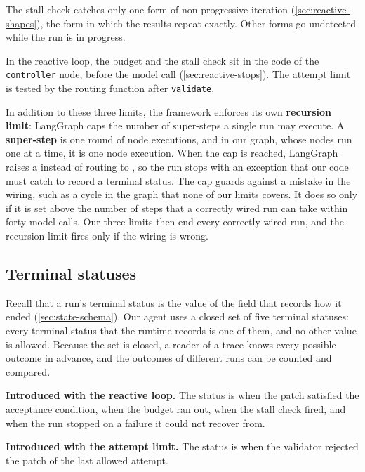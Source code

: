 The stall check catches only one form of non-progressive iteration (\cref{sec:reactive-shapes}),
the form in which the results repeat exactly. Other forms go undetected while the run is in
progress.

In the reactive loop, the budget and the stall check sit in the code of the \texttt{controller}
node, before the model call (\cref{sec:reactive-stops}). The attempt limit is tested by the routing
function after \texttt{validate}.

In addition to these three limits, the framework enforces its own \textbf{recursion limit}:
LangGraph caps the number of super-steps a single run may execute. A \textbf{super-step} is one
round of node executions, and in our graph, whose nodes run one at a time, it is one node
execution. When the cap is reached, LangGraph raises a  instead of
routing to , so the run stops with an exception that our code must catch to record a
terminal status. The cap guards against a mistake in the wiring, such as a cycle in the graph that
none of our limits covers. It does so only if it is set above the number of steps that a correctly
wired run can take within forty model calls. Our three limits then end every correctly wired run,
and the recursion limit fires only if the wiring is wrong.

\subsection{Terminal statuses}
\label{sec:control-statuses}

Recall that a run's terminal status is the value of the  field that records how it
ended (\cref{sec:state-schema}). Our agent uses a closed set of five terminal statuses: every
terminal status that the runtime records is one of them, and no other value is allowed. Because the
set is closed, a reader of a trace knows every possible outcome in advance, and the outcomes of
different runs can be counted and compared.

\bi
\item \textbf{Introduced with the reactive loop.} The status is  when the patch
satisfied the acceptance condition,  when the budget ran out,
 when the stall check fired, and  when the run stopped on a
failure it could not recover from.
\item \textbf{Introduced with the attempt limit.} The status is  when the
validator rejected the patch of the last allowed attempt.
\ei

